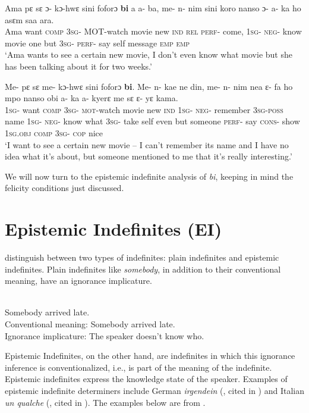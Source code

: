 \documentclass[output=paper,modfonts,nonflat,draftmode]{langsci/langscibook}
\begin{document}
\ex\label{owusu:ex21}
 \gll Ama pε sε ɔ- kɔ-hwε sini foforɔ \textbf{bi} a a- ba, me- n- nim sini koro nanso ɔ- a- ka ho asεm saa ara.\\
Ama want \textsc{comp} \textsc{3sg}- \textsc{MOT}-watch movie new \textsc{ind} \textsc{rel} \textsc{perf}- come, \textsc{1sg}- \textsc{neg}- know movie one but \textsc{3sg}- \textsc{perf}- say self message \textsc{emp} \textsc{emp} \\
\glt `Ama wants to see a certain new movie, I don't even know what movie but she has been talking about it for two weeks.'

\ex\label{owusu:ex20a}
\gll Me- pε sε me- kɔ-hwε sini foforɔ \textbf{bi}. Me- n- kae ne din, me- n- nim nea ε- fa ho mpo nanso obi a- ka a- kyerε me sε ε- yε kama.\\
\textsc{1sg}- want \textsc{comp} \textsc{3sg}- \textsc{mot}-watch movie new \textsc{ind} \textsc{1sg}- \textsc{neg}- remember \textsc{3sg}-\textsc{poss} name \textsc{1sg}- \textsc{neg}- know what \textsc{3sg}- take self even but someone \textsc{perf}- say \textsc{cons}- show \textsc{1sg}.\textsc{obj} \textsc{comp} \textsc{3sg}- \textsc{cop} nice\\
\glt `I want to see a certain new movie – I can’t remember its name and I have no idea what it’s about, but someone mentioned to me that it’s really interesting.'
\z\z

We will now turn to the epistemic indefinite analysis of \emph{bi}, keeping in mind the felicity conditions just discussed.

\section{Epistemic Indefinites (EI)}

\citet{AloniPort2015} distinguish between two types of indefinites: plain indefinites and epistemic indefinites. Plain indefinites like \emph{somebody}, in addition to their conventional meaning, have an ignorance implicature.

\ea
\ea\label{owusu:ex25}\\
 Somebody arrived late.\\
\ea Conventional meaning: Somebody arrived late.\\
\ex Ignorance implicature: The speaker doesn't know who.
\z \z\z


Epistemic Indefinites, on the other hand, are indefinites in which this ignorance inference is conventionalized, i.e., is part of the meaning of the indefinite. Epistemic indefinites express the knowledge state of the speaker. Examples of epistemic indefinite determiners include German \emph{irgendein} (\citealt{Haspelmath1997,KratzerShimoyama2002}, cited in \citealt{AloniPort2015}) and Italian \emph{un qualche}  (\citealt{Zamparelli2007}, cited in \citealt{AloniPort2015}). The examples below are from \citet{AloniPort2015}.
\end{document}
